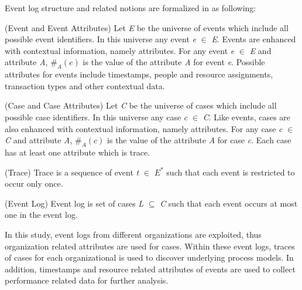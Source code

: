 Event log structure and related notions are formalized in \cite{van2011process} as following:
  \theoremstyle{definition}
  \begin{definition}{}
  (Event and Event Attributes) Let \textit{E} be the universe of events which include all possible event identifiers. In this universe any event \textit{e} $\in$ \textit{E}. Events are enhanced with contextual information, namely attributes. For any event \textit{e} $\in$ \textit{E} and attribute \textit{A}, $\#_\textit{A}(\textit{e})$ is the value of the attribute \textit{A} for event \textit{e}. Possible attributes for events include timestamps, people and resource assignments, transaction types and other contextual data.
  \end{definition}
  \theoremstyle{definition}
  \begin{definition}{}
  (Case and Case Attributes) Let \textit{C} be the universe of cases which include all possible case identifiers. In this universe any case \textit{c} $\in$ \textit{C}. Like events, cases are also enhanced with contextual information, namely attributes. For any case \textit{c} $\in$ \textit{C} and attribute \textit{A}, $\#_\textit{A}(\textit{c})$ is the value of the attribute \textit{A} for case \textit{c}. Each case has at least one attribute which is trace.
  \end{definition}
  \theoremstyle{definition}
  \begin{definition}{}
  (Trace) Trace is a sequence of event \textit{t} $\in$ $\textit{E}^*$ such that each event is restricted to occur only once.
  \end{definition}
  \theoremstyle{definition}
  \begin{definition}{}
  (Event Log) Event log is set of cases \textit{L} $\subseteq$ \textit{C} such that each event occurs at most one in the event log.
  \end{definition}

In this study, event logs from different organizations are exploited, thus organization related attributes are used for cases. Within these event logs, traces of cases for each organizational is used to discover underlying process models. In addition, timestamps and resource related attributes of events are used to collect performance related data for further analysis.

